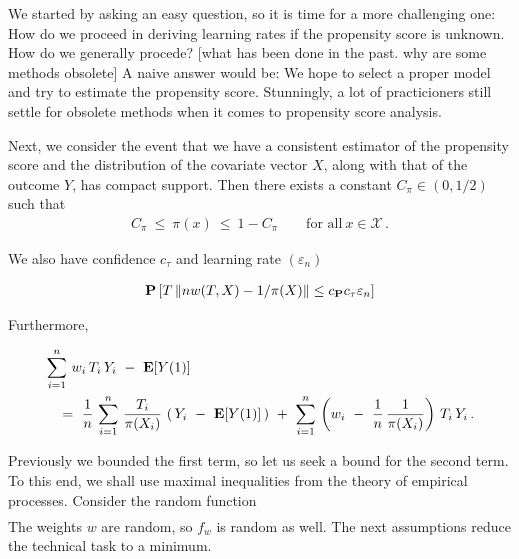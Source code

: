 We started by asking an easy question, so it is time for a more challenging one: How do we proceed in deriving learning rates if the propensity score is unknown.
How do we generally procede?
[what has been done in the past. why are some methods obsolete]
A naive answer would be: We hope to select a proper model and try to estimate the propensity score.
Stunningly, a lot of practicioners still settle for obsolete methods when it comes to propensity score analysis.


Next, we consider the event that we have a consistent estimator of the 
propensity score and the distribution of the covariate vector $X$, 
along with that of the outcome $Y$, 
has compact support.
Then there exists a constant $C_\pi\in (0,1/2)$ such that 
\begin{gather}
  C_\pi \ \le\  \pi(x) \ \le\  1-C_\pi 
  \qquad
  \text{for all}\ 
  x \in \mathcal{X}\,.
\end{gather}

We also have
confidence $c_\tau$ and learning rate $(\varepsilon_n)$

\begin{gather}
  \mathbf{P}
  \left[ 
    T
    \left\lVert
      n w(T,X)
      -
      1/\pi(X)
    \right\rVert
    \le
    c_{\mathbf{P}}
    c_{\tau}
    \varepsilon_n
  \right]
\end{gather}

Furthermore, 

\begin{align}
  \begin{split}
  &\sum_{i=1}^{n}
  \,
  w_i\,T_i\,Y_i
  \ 
  -
  \ 
  \E[Y(1)]
  \\
  &\quad=
    \ 
    \frac{1}{n}
    \,
  \sum_{i=1}^{n}
  \,
    \frac{T_i}{\pi(X_i)}
    \,
  \left(
    \,
    Y_i
    \ 
    -
    \ 
  \E[Y(1)]
  \,
  \right)
  \ +
  \ 
  \sum_{i=1}^{n}
  \,
  \left( 
    w_i
    \ 
    -
    \ 
    \frac{1}{n}\,
    \frac{1}{\pi(X_i)}
  \right)
  \,
  T_i
  \,
  Y_i
  \,.
  \end{split}
\end{align}

Previously we bounded the first term, so let us seek a bound for the second term.
To this end, we shall use maximal inequalities from the theory of empirical processes.
Consider
the random function
\begin{gather}
\end{gather}
The weights $w$ are random, so $f_w$ is random as well. 
The next assumptions reduce the technical task to a minimum.

